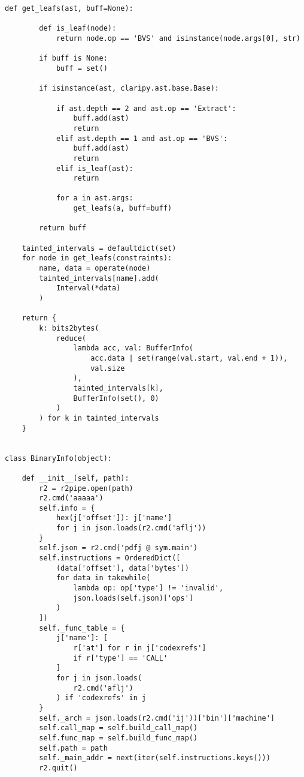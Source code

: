 \begin{lstlisting}[environoment=py_code, caption=taint\_influence.py, captionpos=b]
    def get_leafs(ast, buff=None):

        def is_leaf(node):
            return node.op == 'BVS' and isinstance(node.args[0], str)

        if buff is None:
            buff = set()

        if isinstance(ast, claripy.ast.base.Base):

            if ast.depth == 2 and ast.op == 'Extract':
                buff.add(ast)
                return
            elif ast.depth == 1 and ast.op == 'BVS':
                buff.add(ast)
                return
            elif is_leaf(ast):
                return

            for a in ast.args:
                get_leafs(a, buff=buff)

        return buff

    tainted_intervals = defaultdict(set)
    for node in get_leafs(constraints):
        name, data = operate(node)
        tainted_intervals[name].add(
            Interval(*data)
        )

    return {
        k: bits2bytes(
            reduce(
                lambda acc, val: BufferInfo(
                    acc.data | set(range(val.start, val.end + 1)),
                    val.size
                ),
                tainted_intervals[k],
                BufferInfo(set(), 0)
            )
        ) for k in tainted_intervals
    }


class BinaryInfo(object):

    def __init__(self, path):
        r2 = r2pipe.open(path)
        r2.cmd('aaaaa')
        self.info = {
            hex(j['offset']): j['name']
            for j in json.loads(r2.cmd('aflj'))
        }
        self.json = r2.cmd('pdfj @ sym.main')
        self.instructions = OrderedDict([
            (data['offset'], data['bytes'])
            for data in takewhile(
                lambda op: op['type'] != 'invalid',
                json.loads(self.json)['ops']
            )
        ])
        self._func_table = {
            j['name']: [
                r['at'] for r in j['codexrefs']
                if r['type'] == 'CALL'
            ]
            for j in json.loads(
                r2.cmd('aflj')
            ) if 'codexrefs' in j
        }
        self._arch = json.loads(r2.cmd('ij'))['bin']['machine']
        self.call_map = self.build_call_map()
        self.func_map = self.build_func_map()
        self.path = path
        self._main_addr = next(iter(self.instructions.keys()))
        r2.quit()


\end{lstlisting}
